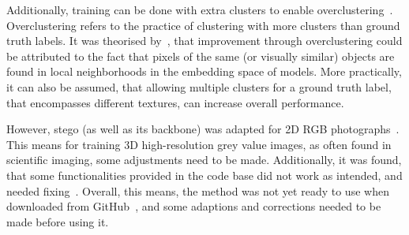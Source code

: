 Additionally, training can be done with extra clusters to enable overclustering~\autocite{Hamilton2022}.
Overclustering refers to the practice of clustering with more clusters than ground truth labels.
It was theorised by~\autocite{VanGansbeke2021}, that improvement through overclustering could be attributed to the fact that pixels of the same (or visually similar) objects are found in local neighborhoods in the embedding space of models.
More practically, it can also be assumed, that allowing multiple clusters for a ground truth label, that encompasses different textures, can increase overall performance.

However, \gls{stego} (as well as its backbone) was adapted for 2D RGB photographs~\autocite{Hamilton2022}.
This means for training 3D high-resolution grey value images, as often found in scientific imaging, some adjustments need to be made.
Additionally, it was found, that some functionalities provided in the code base did not work as intended, and needed fixing~\autocite{mhamilton7232022}.
Overall, this means, the method was not yet ready to use when downloaded from GitHub~\autocite{mhamilton7232022}, and some adaptions and corrections needed to be made before using it.

